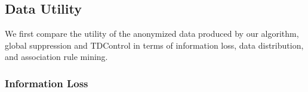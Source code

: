 

%


\subsection{Data Utility}\label{sec:eval:datautility}
We first compare the utility of the anonymized data produced by our algorithm,
global suppression and TDControl in terms of information loss, data distribution,
and association rule mining.

\subsubsection{Information Loss}\label{sec:eval:infoloss}

